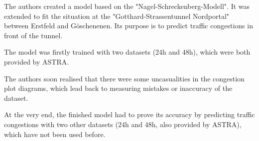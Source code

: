 The authors created a model based on the "Nagel-Schreckenberg-Modell". It was extended to fit the situation at the
"Gotthard-Strassentunnel Nordportal" between Erstfeld and Göschenenen. Its purpose is to predict traffic congestions in
front of the tunnel.

The model was firstly trained with two datasets (24h and 48h), which were both provided by ASTRA.

The authors soon realised that there were some uncasualities in the congestion plot diagrams, which lead back to
measuring mistakes or inaccuracy of the dataset.

At the very end, the finished model had to prove its accuracy by predicting traffic congestions with two other datasets
(24h and 48h, also provided by ASTRA), which have not been used before.
